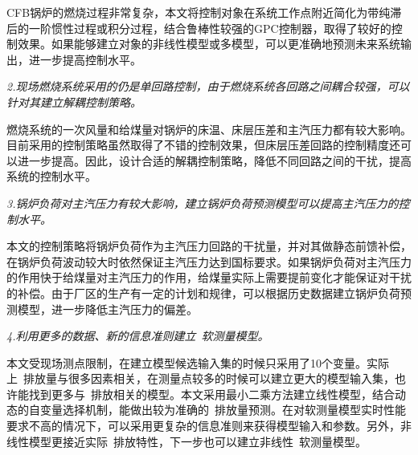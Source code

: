 CFB锅炉的燃烧过程非常复杂，本文将控制对象在系统工作点附近简化为带纯滞后的一阶惯性过程或积分过程，结合鲁棒性较强的GPC控制器，取得了较好的控制效果。如果能够建立对象的非线性模型或多模型，可以更准确地预测未来系统输出，进一步提高控制水平。

\emph{2.现场燃烧系统采用的仍是单回路控制，由于燃烧系统各回路之间耦合较强，可以针对其建立解耦控制策略。}

燃烧系统的一次风量和给煤量对锅炉的床温、床层压差和主汽压力都有较大影响。目前采用的控制策略虽然取得了不错的控制效果，但床层压差回路的控制精度还可以进一步提高。因此，设计合适的解耦控制策略，降低不同回路之间的干扰，提高系统的控制水平。

\emph{3.锅炉负荷对主汽压力有较大影响，建立锅炉负荷预测模型可以提高主汽压力的控制水平。}

本文的控制策略将锅炉负荷作为主汽压力回路的干扰量，并对其做静态前馈补偿，在锅炉负荷波动较大时依然保证主汽压力达到国标要求。如果锅炉负荷对主汽压力的作用快于给煤量对主汽压力的作用，给煤量实际上需要提前变化才能保证对干扰的补偿。由于厂区的生产有一定的计划和规律，可以根据历史数据建立锅炉负荷预测模型，进一步降低主汽压力的偏差。

\emph{4.利用更多的数据、新的信息准则建立~软测量模型。}

本文受现场测点限制，在建立模型候选输入集的时候只采用了10个变量。实际上~排放量与很多因素相关，在测量点较多的时候可以建立更大的模型输入集，也许能找到更多与~排放相关的模型。本文采用最小二乘方法建立线性模型，结合动态的自变量选择机制，能做出较为准确的~排放量预测。在对软测量模型实时性能要求不高的情况下，可以采用更复杂的信息准则来获得模型输入和参数。另外，非线性模型更接近实际~排放特性，下一步也可以建立非线性~软测量模型。

